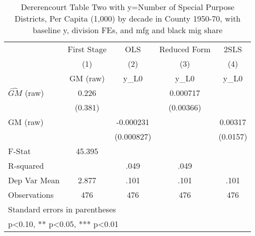 \begin{table}[htbp]\centering
\def\sym#1{\ifmmode^{#1}\else\(^{#1}\)\fi}
\caption{Dererencourt Table Two with y=Number of Special Purpose Districts, Per Capita (1,000) by decade in County 1950-70, with baseline y, division FEs, and mfg and black mig share}
\begin{tabular}{l*{4}{c}}
\toprule
                    & First Stage   &         OLS   &Reduced Form   &        2SLS   \\
                    &\multicolumn{1}{c}{(1)}&\multicolumn{1}{c}{(2)}&\multicolumn{1}{c}{(3)}&\multicolumn{1}{c}{(4)}\\
                    &\multicolumn{1}{c}{GM  (raw)}&\multicolumn{1}{c}{y\_L0}&\multicolumn{1}{c}{y\_L0}&\multicolumn{1}{c}{y\_L0}\\
\midrule
$\hat{GM}$ (raw)    &       0.226   &               &    0.000717   &               \\
                    &     (0.381)   &               &   (0.00366)   &               \\
\addlinespace
GM  (raw)           &               &   -0.000231   &               &     0.00317   \\
                    &               &  (0.000827)   &               &    (0.0157)   \\
\midrule
F-Stat              &      45.395   &               &               &               \\
R-squared           &               &        .049   &        .049   &               \\
Dep Var Mean        &       2.877   &        .101   &        .101   &        .101   \\
Observations        &         476   &         476   &         476   &         476   \\
\bottomrule
\multicolumn{5}{l}{\footnotesize Standard errors in parentheses}\\
\multicolumn{5}{l}{\footnotesize * p<0.10, ** p<0.05, *** p<0.01}\\
\end{tabular}
\end{table}
